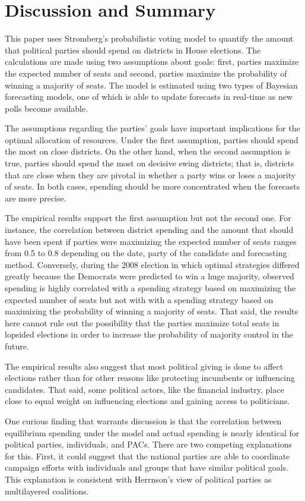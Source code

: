\documentclass[12pt,final,fleqn]{article}
\theoremstyle{plain}
\begin{document}
\section{Discussion and Summary}
This paper uses Stromberg's \citeyear{stromberg2008electoral} probabilistic voting model to quantify the amount that political parties should spend on districts in House elections. The calculations are made using two assumptions about goals: first, parties maximize the expected number of seats and second, parties maximize the probability of winning a majority of seats. The model is estimated using two types of Bayesian forecasting models, one of which is able to update forecasts in real-time as new polls become available.

The assumptions regarding the parties' goals have important implications for the optimal allocation of resources. Under the first assumption, parties should spend the most on close districts. On the other hand, when the second assumption is true, parties should spend the most on decisive swing districts; that is, districts that are close when they are pivotal in whether a party wins or loses a majority of seats. In both cases, spending should be more concentrated when the forecasts are more precise. 

The empirical results support the first assumption but not the second one. For instance, the correlation between district spending and the amount that should have been spent if parties were maximizing the expected number of seats ranges from 0.5 to 0.8 depending on the date, party of the candidate and forecasting method. Conversely, during the 2008 election in which optimal strategies differed greatly because the Democrats were predicted to win a huge majority, observed spending is highly correlated with a spending strategy based on maximizing the expected number of seats but not with with a spending strategy based on maximizing the probability of winning a majority of seats. That said, the results here cannot rule out the possibility that the parties maximize total seats in lopsided elections in order to increase the probability of majority control in the future. 

The empirical results also suggest that most political giving is done to affect elections rather than for other reasons like protecting incumbents or influencing candidates. That said, some political actors, like the financial industry, place close to equal weight on influencing elections and gaining access to politicians.

One curious finding that warrants discussion is that the correlation between equilibrium spending under the model and actual spending is nearly identical for political parties, individuals, and PACs. There are two competing explanations for this. First, it could suggest that the national parties are able to coordinate campaign efforts with individuals and groups that have similar political goals. This explanation is consistent with Herrnson's \citeyear{herrnson2009roles} view of political parties as multilayered coalitions.
\end{document}
